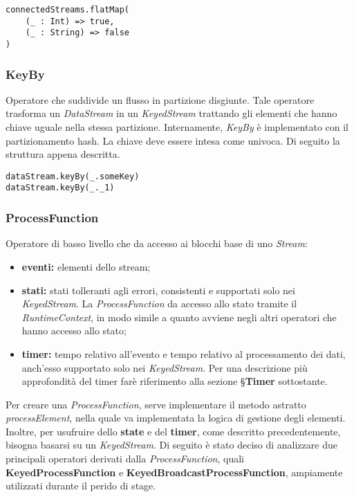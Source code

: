 {\begin{verbatim}
connectedStreams.flatMap(
    (_ : Int) => true,
    (_ : String) => false
)
\end{verbatim}

\subsubsection{KeyBy}
Operatore che suddivide un flusso in partizione disgiunte. Tale operatore trasforma un \textit{DataStream} in un \textit{KeyedStream} trattando gli elementi che hanno chiave uguale nella stessa partizione. Internamente, \textit{KeyBy} è implementato con il partizionamento hash.
La chiave deve essere intesa come univoca.
Di seguito la struttura appena descritta.
\begin{verbatim}
dataStream.keyBy(_.someKey)
dataStream.keyBy(_._1)
\end{verbatim}

\subsubsection{ProcessFunction}
Operatore di basso livello che da accesso ai blocchi base di uno \textit{Stream}:
\begin{itemize}
	\item{\textbf{eventi:} elementi dello stream;}
	\item{\textbf{stati:} stati tolleranti agli errori, consistenti e supportati solo nei \textit{KeyedStream}. La \textit{ProcessFunction} da accesso allo stato tramite il \textit{RuntimeContext}, in modo simile a quanto avviene negli altri operatori che hanno accesso allo stato;}
	\item{\textbf{timer:} tempo relativo all'evento e tempo relativo al processamento dei dati, anch'esso supportato solo nei \textit{KeyedStream}. Per una descrizione più approfondità del timer farè riferimento alla sezione \S\textbf{Timer} sottostante.}
\end{itemize}

Per creare una \textit{ProcessFunction}, serve implementare il metodo astratto \textit{processElement}, nella quale va implementata la logica di gestione degli elementi. Inoltre, per usufruire dello \textbf{state} e del \textbf{timer}, come descritto precedentemente, bisogna basarsi su un \textit{KeyedStream}. Di seguito è stato deciso di analizzare due principali operatori derivati dalla \textit{ProcessFunction}, quali \textbf{KeyedProcessFunction} e \textbf{KeyedBroadcastProcessFunction}, ampiamente utilizzati durante il perido di stage.

}
